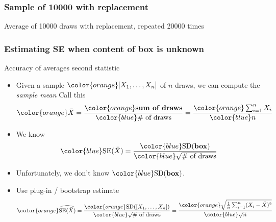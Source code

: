 \documentclass[handout]{beamer}
\begin{document}
   \begin{frame}
   \frametitle{Sample of 10000 with replacement}
   \begin{center}
   \end{center}
   Average of 10000 draws with replacement, repeated 20000 times
   \end{frame}


   \begin{frame} \frametitle{Estimating SE when content of box is unknown}

   \begin{block}
   {Accuracy of averages second statistic}
   \begin{itemize}
   \item Given a sample ${\color{orange}[X_1, \dots, X_n]}$ of $n$ draws, we can compute the {\em sample mean}
   Call this
   $$
   {\color{orange} \bar{X}}  = \frac{{\color{orange} \text{\bf sum of draws}}}{{\color{blue} \text{$\#$ of draws}}}  = \frac{{\color{orange} \sum_{i=1}^n X_i}}{{\color{blue} n}}
   $$
   \item We know
   $$
   \begin{aligned}
   {\color{blue} \text{SE}(\bar{X})} = \frac{{\color{blue}\text{SD({\bf box})}}}{{\color{blue} \sqrt{\text{$\#$ of draws}}}}
   \end{aligned}
   $$

   \item Unfortunately, we don't know ${\color{blue}\text{SD({\bf box})}}$.

   \item Use {\color{orange} plug-in / bootstrap} estimate
   $$
   {\color{orange}\widehat{ \text{SE}(\bar{X})}} = \frac{{\color{orange}\text{SD($[X_1, \dots, X_n]$)}}}{{\color{blue}\sqrt{ \text{$\#$ of draws}}}} =  \frac{{\color{orange} \sqrt{\frac{1}{n}\sum_{i=1}^n (X_i - \bar{X})^2}}}{\color{blue} \sqrt{n}}
   $$

   \end{itemize}
   \end{block}
   \end{frame}

\end{document}
